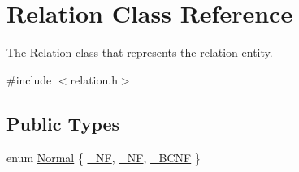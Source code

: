 \hypertarget{class_relation}{}\section{Relation Class Reference}
\label{class_relation}


The \hyperlink{class_relation}{Relation} class that represents the relation entity.  




{\ttfamily \#include $<$relation.\+h$>$}

\subsection*{Public Types}
\begin{DoxyCompactItemize}
\item 
enum \hyperlink{class_relation_af4a36b464d672235cf91635f0816c95e}{Normal} \{ \hyperlink{class_relation_af4a36b464d672235cf91635f0816c95eac6128494e3d974929ae5ecd2e2df07ce}{\+\_\+NF}, 
\hyperlink{class_relation_af4a36b464d672235cf91635f0816c95ea0fbd388d0f5a49eea7bdeea548be03a3}{\+\_\+NF}, 
\hyperlink{class_relation_af4a36b464d672235cf91635f0816c95ea3e7f610cf0dcc22c6d1a3e654e7c16fa}{\+\_\+\+B\+C\+NF}
 \}
\end{DoxyCompactItemize}
